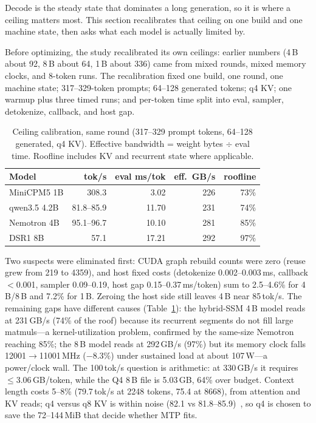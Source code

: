 \documentclass[letterpaper,twocolumn,10pt]{article}
\begin{document}
Decode is the steady state that dominates a long generation, so it is where a
ceiling matters most. This section recalibrates that ceiling on one build and
one machine state, then asks what each model is actually limited by.

Before optimizing, the study recalibrated its own ceilings: earlier numbers
(4\,B about 92, 8\,B about 64, 1\,B about 336) came from mixed rounds, mixed
memory clocks, and 8-token runs. The recalibration fixed one build, one round,
one machine state; 317--329-token prompts; 64--128 generated tokens; q4 KV;
one warmup plus three timed runs; and per-token time split into eval, sampler,
detokenize, callback, and host gap.

\begin{table}[t]
\centering
\small
\setlength{\tabcolsep}{3pt}
\begin{tabular}{@{}lrrrr@{}}
\toprule
Model & tok/s & eval ms/tok & eff.\ GB/s & roofline \\
\midrule
MiniCPM5 1B & 308.3 & 3.02 & 226 & 73\% \\
qwen3.5 4.2B & 81.8--85.9 & 11.70 & 231 & 74\% \\
Nemotron 4B & 95.1--96.7 & 10.10 & 281 & 85\% \\
DSR1 8B & 57.1 & 17.21 & 292 & 97\% \\
\bottomrule
\end{tabular}
\caption{Ceiling calibration, same round (317--329 prompt tokens, 64--128
generated, q4 KV). Effective bandwidth = weight bytes $\div$ eval time.
Roofline includes KV and recurrent state where applicable.}
\label{tab:ceiling}
\end{table}

Two suspects were eliminated first: CUDA graph rebuild counts were zero
(reuse grew from 219 to 4359), and host fixed costs (detokenize
0.002--0.003\,ms, callback $<$0.001, sampler 0.09--0.19, host gap
0.15--0.37\,ms/token) sum to 2.5--4.6\% for 4\,B/8\,B and 7.2\% for 1\,B.
Zeroing the host side still leaves 4\,B near 85\,tok/s. The remaining gaps
have different causes (Table~\ref{tab:ceiling}): the hybrid-SSM 4\,B model
reads at 231\,GB/s (74\% of the roof) because its recurrent segments do not
fill large matmuls---a kernel-utilization problem, confirmed by the same-size
Nemotron reaching 85\%; the 8\,B model reads at 292\,GB/s (97\%) but its memory
clock falls 12001$\rightarrow$11001\,MHz ($-8.3\%$) under sustained load at
about 107\,W---a power/clock wall. The 100\,tok/s question is arithmetic: at
330\,GB/s it requires $\le$3.06\,GB/token, while the Q4 8\,B file is 5.03\,GB,
64\% over budget. Context length costs 5--8\% (79.7\,tok/s at 2248 tokens,
75.4 at 8668), from attention and KV reads; q4 versus q8 KV is within noise
(82.1 vs 81.8--85.9)~\cite{kivi2024}, so q4 is chosen to save the
72--144\,MiB that decide whether MTP fits.
\end{document}
